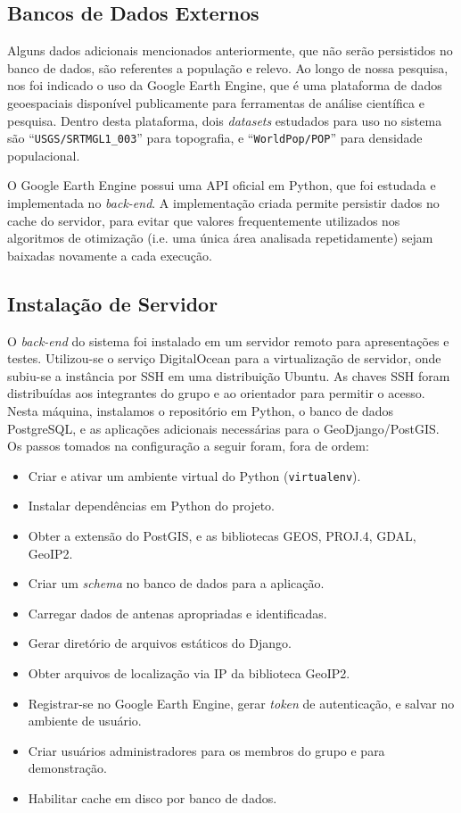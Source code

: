 \documentclass[]{politex}
\begin{document}
\subsection{Bancos de Dados Externos}

Alguns dados adicionais mencionados anteriormente, que não serão persistidos no
banco de dados, são referentes a população e relevo. Ao longo de nossa pesquisa,
nos foi indicado o uso da Google Earth Engine\cite{earthengine}, que é uma plataforma
de dados geoespaciais disponível publicamente para ferramentas de análise
científica e pesquisa. Dentro desta plataforma, dois \textit{datasets} estudados para uso no sistema
são ``\texttt{USGS/SRTMGL1\_003}'' para topografia, e ``\texttt{WorldPop/POP}''
para densidade populacional.

O Google Earth Engine possui uma API oficial em Python, que foi estudada e
implementada no \textit{back-end}. A implementação criada permite persistir dados no
cache do servidor, para evitar que valores frequentemente utilizados nos
algoritmos de otimização (i.e. uma única área analisada repetidamente) sejam baixadas
novamente a cada execução.

\subsection{Instalação de Servidor}

O \textit{back-end} do sistema foi instalado em um servidor remoto para
apresentações e testes. Utilizou-se o serviço DigitalOcean para a virtualização
de servidor, onde subiu-se a instância por SSH em uma distribuição Ubuntu. As
chaves SSH foram distribuídas aos integrantes do grupo e ao orientador para
permitir o acesso. Nesta máquina, instalamos o repositório em Python, o banco
de dados PostgreSQL, e as aplicações adicionais necessárias para o
GeoDjango/PostGIS. Os passos tomados na configuração a seguir foram, fora de
ordem:

\begin{itemize}
\item Criar e ativar um ambiente virtual do Python (\texttt{virtualenv}).
\item Instalar dependências em Python do projeto.
\item Obter a extensão do PostGIS, e as bibliotecas GEOS, PROJ.4, GDAL, GeoIP2.
\item Criar um \textit{schema} no banco de dados para a aplicação.
\item Carregar dados de antenas apropriadas e identificadas.
\item Gerar diretório de arquivos estáticos do Django.
\item Obter arquivos de localização via IP da biblioteca GeoIP2.
\item Registrar-se no Google Earth Engine, gerar \textit{token} de autenticação,
e salvar no ambiente de usuário.
\item Criar usuários administradores para os membros do grupo e para
demonstração.
\item Habilitar cache em disco por banco de dados.
\end{itemize}
\end{document}
